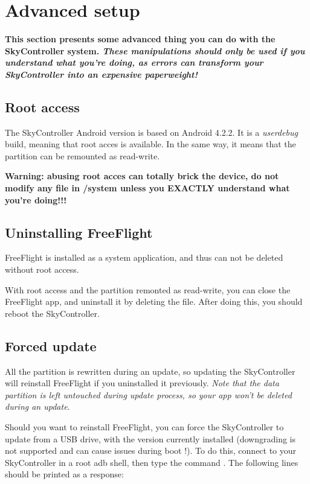 \section{Advanced setup}

\textbf{This section presents some advanced thing you can do with the SkyController system. {\color{red}\emph{These manipulations should only be used if you understand what you're doing, as errors can transform your SkyController into an expensive paperweight!}}}

\subsection{Root access}

The SkyController Android version is based on Android 4.2.2. It is a \textit{userdebug} build, meaning that root acces is available. In the same way, it means that the  partition can be remounted as read-write.

\textbf{Warning: abusing root acces can totally brick the device, do not modify any file in /system unless you EXACTLY understand what you're doing!!!}

\subsection{Uninstalling FreeFlight}

FreeFlight is installed as a system application, and thus can not be deleted without root access.

With root access and the  partition remonted as read-write, you can close the FreeFlight app, and uninstall it by deleting the  file. After doing this, you should reboot the SkyController.

\subsection{Forced update}

All the  partition is rewritten during an update, so updating the SkyController will reinstall FreeFlight if you uninstalled it previously. \emph{Note that the data partition is left untouched during update process, so your app won't be deleted during an update}.

Should you want to reinstall FreeFlight, you can force the SkyController to update from a USB drive, with the version currently installed (downgrading is not supported and can cause issues during boot !). To do this, connect to your SkyController in a root adb shell, then type the command . The following lines should be printed as a response:

